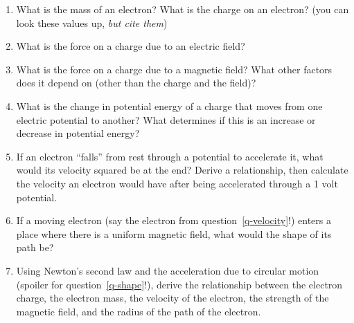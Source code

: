 \documentclass{tufte-handout}
\begin{document}
\begin{enumerate}

    \item What is the mass of an electron? What is the charge on an electron? (you can look these values up, \textit{but cite them})

\item What is the force on a charge due to an electric field?

\item What is the force on a charge due to a magnetic field?  What other factors does it depend on (other than the charge and the field)?

\item What is the change in potential energy of a charge that moves from one electric potential to another?  What determines if this is an increase or decrease in potential energy?

\item \label{q-velocity} If an electron ``falls'' from rest through a potential to accelerate it, what would its velocity squared be at the end? Derive a relationship, then calculate the velocity an electron would have after
being accelerated through a 1 volt potential. 

\item \label{q-shape} If a moving electron (say the electron from question~\ref{q-velocity}!) enters a place where there is a uniform magnetic field, what would the shape of its path be?

\item \label{q-newton} Using Newton's second law and the acceleration due to circular motion (spoiler for question~\ref{q-shape}!), derive the relationship between the electron charge, the electron mass, the velocity of the electron, the strength of the magnetic field, and the radius of the path of the electron.  



\end{enumerate}
\end{document}

